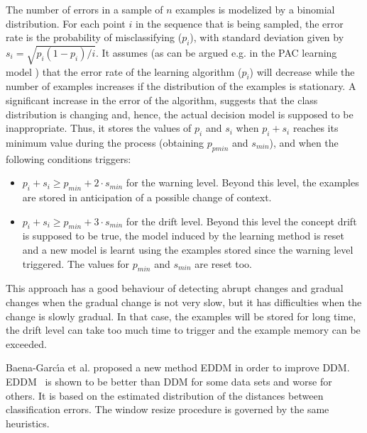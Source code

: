 The number of errors in a sample of $n$ examples is modelized by a binomial distribution. For each point $i$ in the sequence
that is being sampled, the error rate is the probability of misclassifying ($p_i$),
with standard deviation given by $s_i = \sqrt{p_i(1 - p_i)/i}$. It assumes (as can be argued e.g. in the
PAC learning model \cite{Mitchell}) that the error rate of the learning algorithm ($p_i$) will
decrease while the number of examples increases if the distribution of the examples is stationary. A significant increase in the error of the algorithm, suggests
that the class distribution is changing and, hence, the actual decision model is
supposed to be inappropriate. Thus, it stores the values of $p_i$ and $s_i$ when
$p_i+s_i$ reaches its minimum value during the process (obtaining $p_{pmin}$ and $s_{min}$),
and when the following conditions triggers:
\begin{itemize}
\item $p_i + s_i \geq p_{min} + 2 \cdot s_{min}$ for the warning level. Beyond this level, the examples are stored in anticipation of a possible change of context.

\item $p_i + s_i \geq p_{min} + 3 \cdot s_{min}$ for the drift level. Beyond this level the concept drift is supposed to be true, the model induced by the learning method is reset and a new model is learnt using the examples stored since the warning level triggered. The values for $p_{min}$ and $s_{min}$ are reset too.

\end{itemize}

This approach has a good behaviour of detecting abrupt changes and gradual
changes when the gradual change is not very slow, but it has difficulties when
the change is slowly gradual. In that case, the examples will be stored for long
time, the drift level can take too much time to trigger and the example memory
can be exceeded.

Baena-Garc\'{\i}a et al. proposed a new method EDDM in order to improve DDM. 
EDDM~\cite{EDDM} is shown to be better
than DDM for some data sets and worse for others. It is based on the 
estimated distribution of the distances between classification errors.
The window resize procedure is governed by the same heuristics.


\label{Ssochange}


